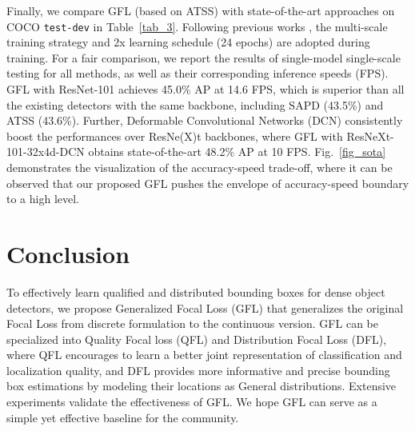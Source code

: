 \documentclass{article}
\begin{document}
Finally, we compare GFL (based on ATSS) with state-of-the-art approaches on COCO {\tt test-dev} in Table~\ref{tab_3}. Following previous works \cite{lin2017focal,tian2019fcos}, the multi-scale training strategy and 2x learning schedule (24 epochs) are adopted during training. For a fair comparison, we report the results of single-model single-scale testing for all methods, as well as their corresponding inference speeds (FPS). GFL with ResNet-101 \cite{he2016deep} achieves 45.0\% AP at 14.6 FPS, which is superior than all the existing detectors with the same backbone, including SAPD \cite{zhu2019soft} (43.5\%) and ATSS \cite{zhang2019bridging} (43.6\%). Further, Deformable Convolutional Networks (DCN) \cite{zhu2019deformable} consistently boost the performances over ResNe(X)t backbones, where GFL with ResNeXt-101-32x4d-DCN obtains state-of-the-art 48.2\% AP at 10 FPS. Fig.~\ref{fig_sota} demonstrates the visualization of the accuracy-speed trade-off, where it can be observed that our proposed GFL pushes the envelope of accuracy-speed boundary to a high level. 






\section{Conclusion}
\vspace{-2pt}
To effectively learn qualified and distributed bounding boxes for dense object detectors, we propose Generalized Focal Loss (GFL) that generalizes the original Focal Loss from  discrete formulation to the continuous version. GFL can be specialized into Quality Focal loss (QFL) and Distribution Focal Loss (DFL), where QFL encourages to learn a better joint representation of classification and localization quality, and DFL provides more informative and precise bounding box estimations by modeling their locations as General distributions. Extensive experiments validate the effectiveness of GFL. We hope GFL can serve as a simple yet effective baseline for the community.




\small




\clearpage
\appendix
\end{document}
